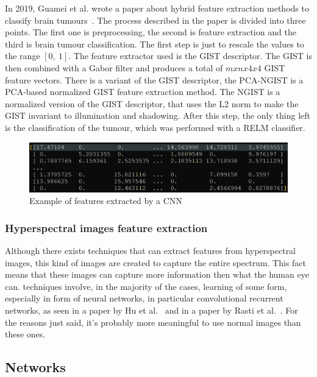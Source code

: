 \documentclass[conference]{IEEEtran}
\begin{document}
				\noindent In 2019, Guamei et al. wrote a paper about hybrid feature extraction methods to classify brain tumours~\cite{gumaei2019hybrid}. The process described in the paper is divided into three points. The 
				first one is preprocessing, the second is feature extraction and the third is brain tumour classification. The first step is just to rescale the values to the range $[0,\ 1]$. The feature extractor 
				used is the GIST descriptor. The GIST is then combined with a Gabor filter and produces a total of $mxnx4x4$ GIST feature vectors. There is a variant of the GIST descriptor, the 
				PCA-NGIST is a PCA-based normalized GIST feature extraction method. The NGIST is a normalized version of the GIST descriptor, that uses the L2 norm to make the GIST invariant to illumination and shadowing. 
				After this step, the only thing left is the classification of the tumour, which was performed with a RELM classifier. 
				
				\begin{figure}[!ht]
					\centerline{\includegraphics[width=\linewidth]{imgs/cnn_features.png}}
					\caption{Example of features extracted by a CNN}
					\label{fig:4}
				\end{figure}	
				
			\subsubsection{Hyperspectral images feature extraction}
				
				Although there exists techniques that can extract features from hyperspectral images, this kind of images are created to capture the entire spectrum. This fact means that these images can capture 
				more information then what the human eye can. techniques involve, in the majority of the cases, learning of some form, especially in form of neural networks, in particular convolutional recurrent 
				networks, as seen in a paper by Hu et al.~\cite{hu2020spatial} and in a paper by Rasti et al.~\cite{rasti2020feature}. For the reasons just said, it's probably more meaningful to use normal 
				images than these ones.
		
		\subsection{Networks}
		
\end{document}
